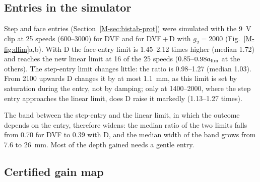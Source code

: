 \subsection{Entries in the simulator}\label{supp:delayed-entry}

Step and face entries (Section~\ref{M-sec:bistab-prot}) were simulated with the \SI{9}{\volt} clip at 25 speeds (\SIrange{600}{3000}{\rpm}) for DVF and for DVF\,+\,D with $g_2=2000$ (Fig.~\ref{M-fig:dlim}a,b). With D the face-entry limit is 1.45--2.12 times higher (median 1.72) and reaches the new linear limit at 16 of the 25 speeds (0.85--$0.98a_{\lim}$ at the others). The step-entry limit changes little: the ratio is 0.98--1.27 (median 1.03). From \SI{2100}{\rpm} upwards D changes it by at most \SI{1.1}{\milli\metre}, as this limit is set by saturation during the entry, not by damping; only at \SIrange{1400}{2000}{\rpm}, where the step entry approaches the linear limit, does D raise it markedly (1.13--1.27 times).

The band between the step-entry and the linear limit, in which the outcome depends on the entry, therefore widens: the median ratio of the two limits falls from 0.70 for DVF to 0.39 with D, and the median width of the band grows from 7.6 to \SI{26}{\milli\metre}. Most of the depth gained needs a gentle entry.

\subsection{Certified gain map}\label{supp:delayed-map}

